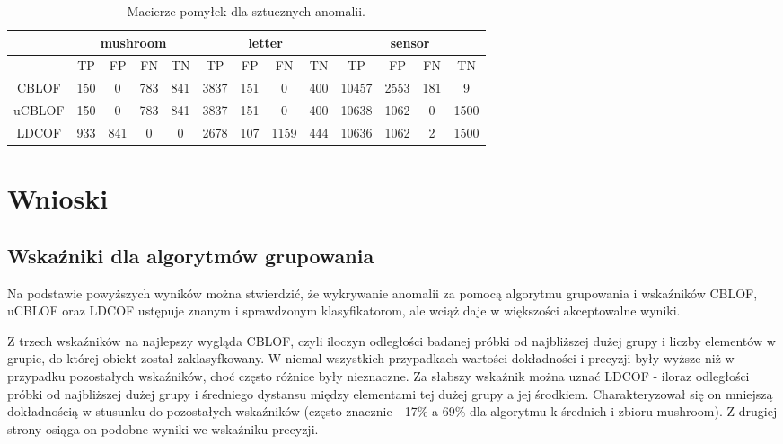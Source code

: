 \documentclass[11pt,a4paper,twoside]{article}
\begin{document}
\begin{table}[ht]
\centering
\caption{Macierze pomyłek dla sztucznych anomalii.}
\label{confMatrix_v1}
\begin{tabular}{|*{13}{c|}}
\hline
 & \multicolumn{4}{c|}{mushroom} & \multicolumn{4}{c|}{letter} & \multicolumn{4}{c|}{sensor} \\\hline
 & TP & FP & FN & TN  & TP & FP & FN & TN  & TP & FP & FN & TN \\\hline
 CBLOF &    150   &   0        &    783    &        841          &   3837   &   151     &  0      &  400  &   10457    &  2553     &   181  &  9  \\\hline
 uCBLOF &  150    &   0        &   783    &       841         &   3837   &   151     &  0       & 400  &   10638  &   1062    &   0   &  1500 \\\hline
 LDCOF &    933   &    841    &    0      &        0           &   2678   &   107     &  1159  & 444  &   10636   &  1062 &   2       &   1500      \\\hline
\end{tabular}
\end{table}


\section {Wnioski}

\subsection {Wskaźniki dla algorytmów grupowania}

Na podstawie powyższych wyników można stwierdzić, że wykrywanie anomalii za pomocą algorytmu grupowania i wskaźników CBLOF, uCBLOF oraz LDCOF ustępuje znanym i sprawdzonym klasyfikatorom, ale wciąż daje w większości akceptowalne wyniki. 

Z trzech wskaźników na najlepszy wygląda CBLOF, czyli iloczyn odległości badanej próbki od najbliższej dużej grupy i liczby elementów w grupie, do której obiekt został zaklasyfkowany. W niemal wszystkich przypadkach wartości dokładności i precyzji były wyższe niż w przypadku pozostałych wskaźników, choć często różnice były nieznaczne. Za słabszy wskaźnik można uznać LDCOF - iloraz odległości próbki od najbliższej dużej grupy i średniego dystansu między elementami tej dużej grupy a jej środkiem. Charakteryzował się on mniejszą dokładnością w stusunku do pozostałych wskaźników (często znacznie - 17\% a 69\% dla algorytmu k-średnich i zbioru mushroom). Z drugiej strony osiąga on podobne wyniki we wskaźniku precyzji.
\end{document}
